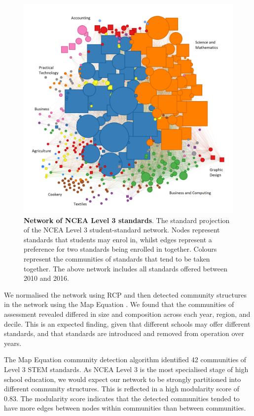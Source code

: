 \begin{landscape}
\begin{figure}
    \centering
    \includegraphics[width = \textwidth]{C2 - Student Pathways/L3NCEA_STEM_Network_All.png}
    \caption{\textbf{Network of NCEA Level 3 standards}. The standard projection of the NCEA Level 3 student-standard network. Nodes represent standards that students may enrol in, whilst edges represent a preference for two standards being enrolled in together. Colours represent the communities of standards that tend to be taken together. The above network includes all standards offered between 2010 and 2016.}
    \label{fig:NetworkAll}
\end{figure}
\end{landscape} We normalised the network using RCP and then detected community structures in the network using the Map Equation \cite{rosvall2009map}. We found that the communities of assessment revealed differed in size and composition across each year, region, and decile. This is an expected finding, given that different schools may offer different standards, and that standards are introduced and removed from operation over years.

The Map Equation community detection algorithm identified 42 communities of Level 3 STEM standards. As NCEA Level 3 is the most specialised stage of high school education, we would expect our network to be strongly partitioned into different community structures. This is reflected in a high modularity score of 0.83. The modularity score indicates that the detected communities tended to have more edges between nodes within communities than between communities. 


